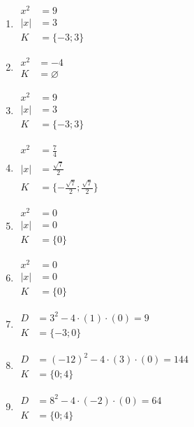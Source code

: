 \documentclass[11pt,a4paper]{article}
\begin{document}
\begin{enumerate}[label={},itemsep=9pt]
\item[\textbf{A012}] \(\displaystyle \begin{aligned}x^2&=9\\|x|&=3\\K&=\{-3;3\}\end{aligned}\)\par
\item[\textbf{A013}] \(\displaystyle \begin{aligned}x^2&=-4\\K&=\varnothing\end{aligned}\)\par
\item[\textbf{A014}] \(\displaystyle \begin{aligned}x^2&=9\\|x|&=3\\K&=\{-3;3\}\end{aligned}\)\par
\item[\textbf{A015}] \(\displaystyle \begin{aligned}x^2&=\frac74\\|x|&=\frac{\sqrt7}{2}\\K&=\{-\frac{\sqrt7}{2};\frac{\sqrt7}{2}\}\end{aligned}\)\par
\item[\textbf{A016}] \(\displaystyle \begin{aligned}x^2&=0\\|x|&=0\\K&=\{0\}\end{aligned}\)\par
\item[\textbf{A017}] \(\displaystyle \begin{aligned}x^2&=0\\|x|&=0\\K&=\{0\}\end{aligned}\)\par
\item[\textbf{A018}] \(\displaystyle \begin{aligned}D&=3^2-4\cdot(1)\cdot(0)=9\\K&=\{-3;0\}\end{aligned}\)\par
\item[\textbf{A019}] \(\displaystyle \begin{aligned}D&=(-12)^2-4\cdot(3)\cdot(0)=144\\K&=\{0;4\}\end{aligned}\)\par
\item[\textbf{A020}] \(\displaystyle \begin{aligned}D&=8^2-4\cdot(-2)\cdot(0)=64\\K&=\{0;4\}\end{aligned}\)\par
\end{enumerate}
\end{document}
